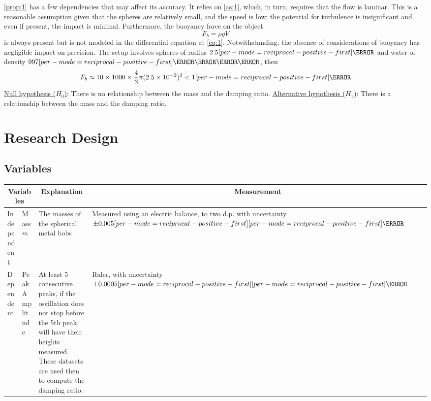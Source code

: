 \documentclass[a4paper,12pt]{article}
\let\oldsi\si
\renewcommand{\si}[1]{\oldsi[per-mode=reciprocal-positive-first]{#1}}
\newcommand{\thcolor}{\cellcolor{Blue!25}}
\begin{document}
\cref{prop:1} has a few dependencies that may affect its accuracy. It relies on \cref{as:1}, which, in turn, requires that the flow is laminar. This is a reasonable assumption given that the spheres are relatively small, and the speed is low; the potential for turbulence is insignificant and even if present, the impact is minimal. Furthermore, the buoyancy force on the object
$$F_b = \rho g V$$
is always present but is not modeled in the differential equation at \cref{eq:1}. Notwithstanding, the absence of considerations of buoyancy has negligible impact on precision. The setup involves spheres of radius $2.5\si{\cm}$ and water of density $997\si{\kg\per\m\cubed}$, then
$$F_b \approx 10 \times 1000 \times \frac{4}{3}\pi (2.5\times 10^{-2})^3 < 1\si{\N}$$
\underline{Null hypothesis ($H_0$)}: There is no relationship between the mass and the damping ratio.
\underline{Alternative hypothesis ($H_1$)}: There is a relationship between the mass and the damping ratio.
\pagebreak

\section{Research Design}

\subsection{Variables}
\begin{center}
  \begin{tabular}{|p{}|p{}|p{}|p{}|}
    \hline
    \multicolumn{2}{|c}{\thcolor Variables} & \multicolumn{1}{|c}{\thcolor Explanation} & \multicolumn{1}{|c|}{\thcolor Measurement}                                                                                                                                                                                                                              \\  \hline
    Independent                             & Mass $m$                                  & The masses of the spherical metal bobs                                                                                                                                           & Measured using an electric balance, to two d.p. with uncertainty $\pm 0.005 \si{\g}$ \\
    \hline
    Dependent                               & Peak Amplitude                            & At least 5 consecutive peaks, if the oscillation does not stop before the 5th peak, will have their heights measured. These datasets are used then to compute the damping ratio. & Ruler, with uncertainty $\pm 0.0005\si{\m}$                                          \\
    \hline
  \end{tabular}
  \label{tab:1}
\end{center}
\end{document}
